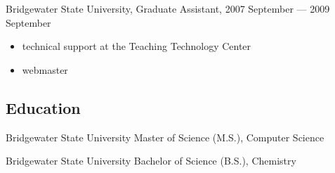 \documentclass[letterpaper,12pt]{article}
\begin{document}
Bridgewater State University, Graduate Assistant, 2007 September --- 2009 September

\begin{itemize}
\item technical support at the Teaching Technology Center
\item webmaster
\end{itemize}

\subsection*{Education}

Bridgewater State University
Master of Science (M.S.), Computer Science

Bridgewater State University
Bachelor of Science (B.S.), Chemistry
\end{document}
